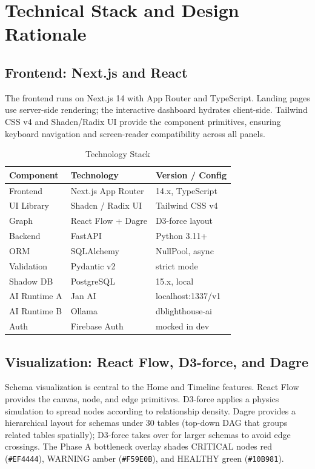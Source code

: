 \documentclass[conference]{IEEEtran}
\begin{document}
\section{Technical Stack and Design Rationale}

\subsection{Frontend: Next.js and React}

The frontend runs on Next.js 14 with App Router and TypeScript. Landing
pages use server-side rendering; the interactive dashboard hydrates
client-side. Tailwind CSS v4 and Shadcn/Radix UI provide the component
primitives, ensuring keyboard navigation and screen-reader compatibility
across all panels.

\begin{table}[htbp]
\caption{Technology Stack}
\label{tab:stack}
\begin{tabular}{lll}
\toprule
\textbf{Component} & \textbf{Technology} & \textbf{Version / Config} \\
\midrule
Frontend & Next.js App Router & 14.x, TypeScript \\
UI Library & Shadcn / Radix UI & Tailwind CSS v4 \\
Graph & React Flow + Dagre & D3-force layout \\
Backend & FastAPI & Python 3.11+ \\
ORM & SQLAlchemy & NullPool, async \\
Validation & Pydantic v2 & strict mode \\
Shadow DB & PostgreSQL & 15.x, local \\
AI Runtime A & Jan AI & localhost:1337/v1 \\
AI Runtime B & Ollama & dblighthouse-ai \\
Auth & Firebase Auth & mocked in dev \\
\bottomrule
\end{tabular}
\end{table}

\subsection{Visualization: React Flow, D3-force, and Dagre}

Schema visualization is central to the Home and Timeline features. React
Flow provides the canvas, node, and edge primitives. D3-force applies a
physics simulation to spread nodes according to relationship density.
Dagre provides a hierarchical layout for schemas under 30 tables
(top-down DAG that groups related tables spatially); D3-force takes over
for larger schemas to avoid edge crossings. The Phase A bottleneck overlay
shades CRITICAL nodes red (\texttt{\#EF4444}), WARNING amber
(\texttt{\#F59E0B}), and HEALTHY green (\texttt{\#10B981}).
\end{document}

